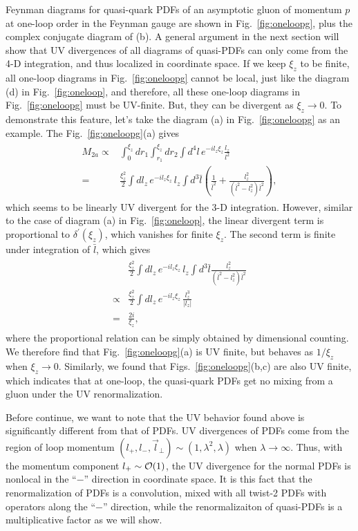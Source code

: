 \documentclass[twocolumn,aps,prd,superscriptaddress,nofootinbib,showpacs]{revtex4}
\begin{document}
Feynman diagrams for quasi-quark PDFs of an asymptotic gluon of momentum $p$ at one-loop order in the Feynman gauge are shown in Fig.~\ref{fig:oneloopg}, plus the complex conjugate diagram of (b). A general argument in the next section will show that UV divergences of all diagrams of quasi-PDFs can only come from the 4-D integration, and thus localized in coordinate space. If we keep $\xi_z$ to be finite, all one-loop diagrams in Fig.~\ref{fig:oneloopg} cannot be local, just like the diagram (d) in Fig.~\ref{fig:oneloop}, and therefore, all these one-loop diagrams in Fig.~\ref{fig:oneloopg} must be UV-finite.  But, they can be divergent as $\xi_z\to 0$. To demonstrate this feature, let's take the diagram (a) in Fig.~\ref{fig:oneloopg} as an example. The Fig.~\ref{fig:oneloopg}(a) gives
\begin{align}
\begin{split}\label{eq:2a0}
M_{2a}\propto& \int_0^{\xi_z} dr_1 \int_{r_1}^{\xi_z} dr_2 \int d^4l\, e^{-il_z \xi_z} \frac{l_z}{l^2} \\
=&\frac{\xi_z^2}{2}\int dl_z \, e^{-il_z \xi_z} \, l_z \int d^{3}\bar{l} \left( \frac{1}{\bar{l}^2}+ \frac{l_z^2}{(\bar{l}^2-l_z^2)\bar{l}^2}\right),
\end{split}
\end{align}
which seems to be linearly UV divergent for the 3-D integration. However, similar to the case of diagram (a) in Fig.~\ref{fig:oneloop}, the linear divergent term is proportional to $\delta^\prime(\xi_z)$, which vanishes for finite $\xi_z$. The second term is finite under integration of $\bar{l}$, which gives
\begin{align}
\begin{split}\label{eq:2a}
& \frac{\xi_z^2}{2}\int dl_z \, e^{-il_z \xi_z} \, l_z \int d^{3}\bar{l} \frac{l_z^2}{(\bar{l}^2-l_z^2)\bar{l}^2}\\
\propto&\frac{\xi_z^2}{2}\int dl_z \, e^{-il_z \xi_z} \, \frac{l_z^3}{|l_z|}\\
=&\frac{2i}{\xi_z},
\end{split}
\end{align}
where the proportional relation can be simply obtained by dimensional counting. We therefore find that Fig.~\ref{fig:oneloopg}(a) is UV finite, but behaves as $1/\xi_z$ when $\xi_z \to 0$. Similarly, we found that Figs.~\ref{fig:oneloopg}(b,c) are also UV finite, which indicates that at one-loop, the quasi-quark PDFs get no mixing from a gluon under the UV renormalization.


Before continue, we want to note that the UV behavior found above is significantly different from that of PDFs.  UV divergences of PDFs come from the region of loop momentum $(l_+, l_-, \vec{l}_\perp)\sim(1,\lambda^2,\lambda)$ when $\lambda\to\infty$. Thus, with the momentum component $l_+\sim {\cal O}(1)$, the UV divergence for the normal PDFs is nonlocal in the ``$-$'' direction in coordinate space. It is this fact that the renormalization of PDFs is a convolution, mixed with all twist-2 PDFs with operators along the ``$-$'' direction, while the renormalizaiton of quasi-PDFs is a multiplicative factor as we will show.
\end{document}
